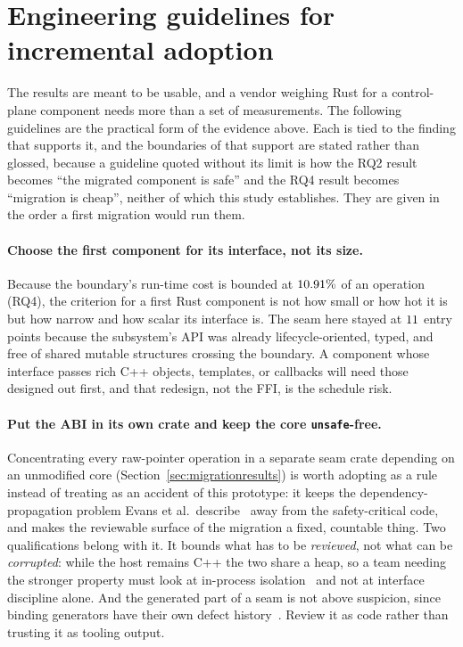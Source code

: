 \documentclass[english,twoside,openright,a4paper,censored,csm,software-track-2020]{HYthesisML}
\begin{document}
\section{Engineering guidelines for incremental adoption}
\label{sec:guidelines}
The results are meant to be usable, and a vendor weighing Rust for a control-plane component
needs more than a set of measurements. The following guidelines are the practical form of the
evidence above. Each is tied to the finding that supports it, and the boundaries of that
support are stated rather than glossed, because a guideline quoted without its limit is how the
RQ2 result becomes ``the migrated component is safe'' and the RQ4 result becomes ``migration is
cheap'', neither of which this study establishes. They are given in the order a first migration
would run them.

\paragraph{Choose the first component for its interface, not its size.}
Because the boundary's run-time cost is bounded at $10.91\%$ of an operation (RQ4), the
criterion for a first Rust component is not how small or how hot it is but how narrow and how
scalar its interface is. The seam here stayed at $11$ entry points because the subsystem's API
was already lifecycle-oriented, typed, and free of shared mutable structures crossing the
boundary. A component whose interface passes rich C++ objects, templates, or callbacks will need
those designed out first, and that redesign, not the FFI, is the schedule risk.

\paragraph{Put the ABI in its own crate and keep the core \texttt{unsafe}-free.}
Concentrating every raw-pointer operation in a separate seam crate depending on an unmodified
core (Section~\ref{sec:migrationresults}) is worth adopting as a rule instead of treating as an
accident of this prototype: it keeps the dependency-propagation problem Evans et al.\
describe~\cite{evans2020rust} away from the safety-critical code, and makes the reviewable
surface of the migration a fixed, countable thing. Two qualifications belong with it. It bounds
what has to be \emph{reviewed}, not what can be \emph{corrupted}: while the host remains C++ the
two share a heap, so a team needing the stronger property must look at in-process
isolation~\cite{rivera2021galeed,kirth2022pkrusafe} and not at interface discipline alone.
And the generated part of a seam is not above suspicion, since binding generators have their own
defect history~\cite{cai2026interop}. Review it as code rather than trusting it as tooling
output.
\end{document}
